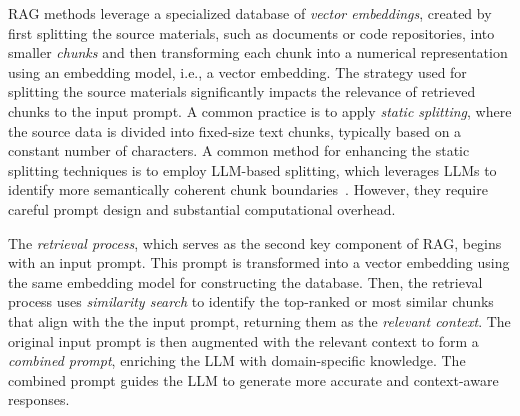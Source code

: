 RAG methods leverage a specialized database of \textit{vector embeddings}, created by first splitting the source materials, such as documents or code repositories, into smaller \textit{chunks} and then transforming each chunk into a numerical representation using an embedding model, i.e., a vector embedding. 
The strategy used for splitting the source materials significantly impacts the relevance of retrieved chunks to the input prompt. 
A common practice is to apply \textit{static splitting}, where the source data is divided into fixed-size text chunks, typically based on a constant number of characters. 
A common method for enhancing the static splitting techniques is to employ LLM-based splitting, which leverages LLMs to identify more semantically coherent chunk boundaries~\cite{singh24,chang24n,dong24}.
However, they require careful prompt design and substantial computational overhead.

The \textit{retrieval process}, which serves as the second key component of RAG, begins with an input prompt.
This prompt is transformed into a vector embedding using the same embedding model for constructing the database.
Then, the retrieval process uses \textit{similarity search} to identify the top-ranked or most similar chunks that align with the the input prompt, returning them as the \textit{relevant context}.
The original input prompt is then augmented with the relevant context to form a \textit{combined prompt}, enriching the LLM with domain-specific knowledge. 
The combined prompt guides the LLM to generate more accurate and context-aware responses. 


